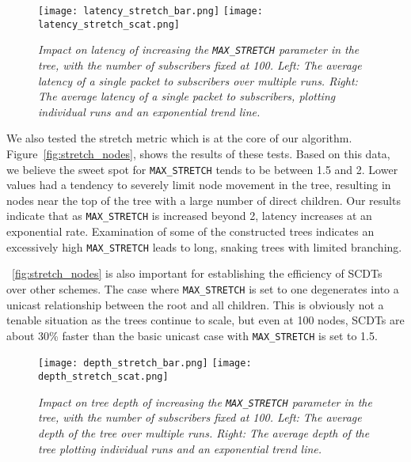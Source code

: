 \begin{figure}[h]
	\begin{center}
		\texttt{[image: latency\_stretch\_bar.png]}
		\texttt{[image: latency\_stretch\_scat.png]}
	\end{center}
	\vspace{-1.3em}
	\caption{\small \itshape Impact on latency of increasing the \texttt{MAX\_STRETCH} parameter in the tree, with the number of subscribers fixed at 100. Left: The average latency of a single packet to subscribers over multiple runs. Right: The average latency of a single packet to subscribers, plotting individual runs and an exponential trend line.}
	\vspace{-1em}
	\label{fig:stretch_nodes}
\end{figure}

We also tested the stretch metric which is at the core of our algorithm. Figure~\autoref{fig:stretch_nodes}, shows the results of these tests. Based on this data, we believe the sweet spot for \texttt{MAX\_STRETCH} tends to be between 1.5 and 2. Lower values had a tendency to severely limit node movement in the tree, resulting in nodes near the top of the tree with a large number of direct children. Our results indicate that as \texttt{MAX\_STRETCH} is increased beyond 2, latency increases at an exponential rate. Examination of some of the constructed trees indicates an excessively high \texttt{MAX\_STRETCH} leads to long, snaking trees with limited branching.

~\autoref{fig:stretch_nodes} is also important for establishing the efficiency of SCDTs over other schemes.  The case where \texttt{MAX\_STRETCH} is set to one degenerates into a unicast relationship between the root and all children. This is obviously not a tenable situation as the trees continue to scale, but even at 100 nodes, SCDTs are about 30\% faster than the basic unicast case with \texttt{MAX\_STRETCH} is set to 1.5.

\begin{figure}[h]
	\begin{center}
		\texttt{[image: depth\_stretch\_bar.png]}
		\texttt{[image: depth\_stretch\_scat.png]}
	\end{center}
	\vspace{-1.3em}
	\caption{\small \itshape Impact on tree depth of increasing the \texttt{MAX\_STRETCH} parameter in the tree, with the number of subscribers fixed at 100. Left: The average depth of the tree over multiple runs. Right: The average depth of the tree plotting individual runs and an exponential trend line.}
	\vspace{-1em}
	\label{fig:depth_stretch}
\end{figure}

